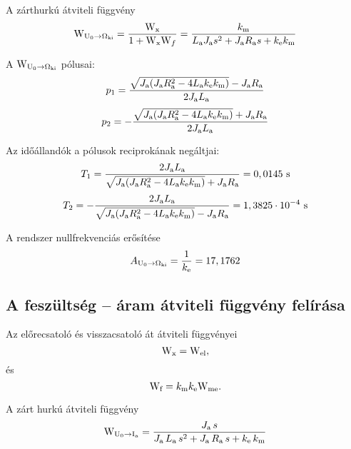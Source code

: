 A zárthurkú átviteli függvény
\begin{equation}
	\mathrm{W}_{\mathrm{U}_0\rightarrow\Omega_\text{ki}} =
	\frac{\mathrm{W}_\text{x}}{1 + \mathrm{W}_\text{x}\mathrm{W}_f} =
	\frac{k_\text{m} }{L_\text{a}J_\text{a} s^2 + J_\text{a}R_\text{a} s + k_\text{e}k_\text{m}}
\end{equation}

A $\mathrm{W}_{\mathrm{U}_0\rightarrow\Omega_\text{ki}}$ pólusai:
\begin{equation}
	p_1 = \frac{\sqrt{J_\text{a}(J_\text{a}R_\text{a}^2 - 4L_\text{a}k_\text{e}k_\text{m})} - J_\text{a}R_\text{a}}{2J_\text{a}L_\text{a}}
\end{equation}
\begin{equation}
	p_2 = -\frac{\sqrt{J_\text{a}(J_\text{a}R_\text{a}^2 - 4L_\text{a}k_\text{e}k_\text{m})} + J_\text{a}R_\text{a}}{2J_\text{a}L_\text{a}}
\end{equation}

Az időállandók a pólusok reciprokának negáltjai:
\begin{equation}\label{eq:T1}
	T_1 = \frac{2J_\text{a}L_\text{a}}{\sqrt{J_\text{a}(J_\text{a}R_\text{a}^2 - 4L_\text{a}k_\text{e}k_\text{m})} + J_\text{a}R_\text{a}} = 0,0145\text{ s}
\end{equation}
\begin{equation}
	T_2 = -\frac{2J_\text{a}L_\text{a}}{\sqrt{J_\text{a}(J_\text{a}R_\text{a}^2 - 4L_\text{a}k_\text{e}k_\text{m})} - J_\text{a}R_\text{a}} = 1,3825\cdot 10^{-4}\text{ s}
\end{equation}

A rendszer nullfrekvenciás erősítése
\begin{equation}
	A_{\mathrm{U}_0\rightarrow\Omega_\text{ki}} = \frac{1}{k_\text{e}} = 17,1762
\end{equation}


\subsection{A feszültség -- áram átviteli függvény felírása}
\label{subsect:Wu-i}

Az előrecsatoló és visszacsatoló át átviteli függvényei
\begin{equation}
	\mathrm{W}_\text{x} = \mathrm{W}_\text{el},
\end{equation} és 
\begin{equation}
	\mathrm{W}_\text{f} = k_\text{m}k_\text{e}\mathrm{W}_\text{me}.
\end{equation}

A zárt hurkú átviteli függvény
\begin{equation}
	\mathrm{W}_{\mathrm{U}_0\rightarrow \mathrm{I}_\text{a}} = 
	\frac{J_\text{a}\, s}{J_\text{a}\, L_\text{a}\, s^2 + J_\text{a}\, R_\text{a}\, s + k_\text{e}\, k_\text{m}}
\end{equation}

